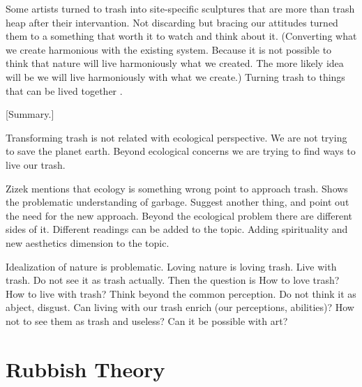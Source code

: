 Some artists turned to trash into site-specific sculptures that are more than trash heap after their intervantion. Not discarding but bracing our attitudes turned them to a something that worth it to watch and think about it. (Converting what we create harmonious with the existing system. Because it is not possible to think that nature will live harmoniously what we created. The more likely idea will be we will live harmoniously with what we create.) Turning trash to things that can be lived together .


[Summary.] 

Transforming trash is not related with ecological perspective. We are not trying to save the planet earth. Beyond ecological concerns we are trying to find ways to live our trash. 

Zizek mentions that ecology is something wrong point to approach trash. Shows the problematic understanding of garbage. Suggest another thing, and point out the need for the new approach. Beyond the ecological problem there are different sides of it. Different readings can be added to the topic. Adding spirituality and new aesthetics dimension to the topic. 

Idealization of nature is problematic. Loving nature is loving trash. Live with trash. Do not see it as trash actually. Then the question is How to love trash? How to live with trash? Think beyond the common perception. Do not think it as abject, disgust. Can living with our trash enrich (our perceptions, abilities)? How not to see them as trash and useless? Can it be possible with art?






%
%
\section{Rubbish Theory}

